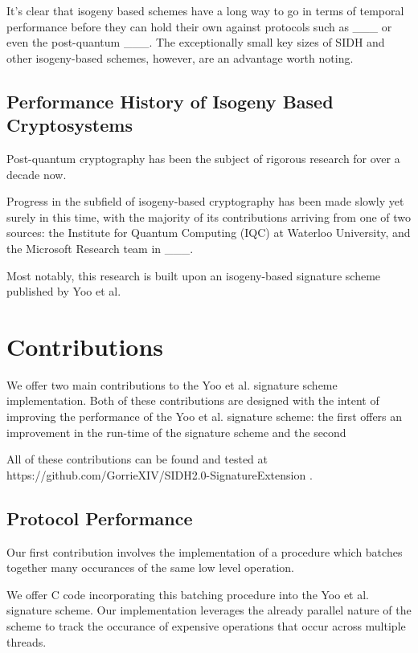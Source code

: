 It's clear that isogeny based schemes have a long way to go in terms of temporal performance before they can hold their own against protocols such as \_\_\_ or even the post-quantum \_\_\_. The exceptionally small key sizes of SIDH and other isogeny-based schemes, however, are an advantage worth noting. 

\subsection{Performance History of Isogeny Based Cryptosystems}

Post-quantum cryptography has been the subject of rigorous research for over a decade now. 

Progress in the subfield of isogeny-based cryptography has been made slowly yet surely in this time, with the majority of its contributions arriving from one of two sources: the Institute for Quantum Computing (IQC) at Waterloo University, and the Microsoft Research team in \_\_\_. 

Most notably, this research is built upon an isogeny-based signature scheme published by Yoo et al. 

\section{Contributions}

We offer two main contributions to the Yoo et al. signature scheme implementation. Both of these contributions are designed with the intent of improving the performance of the Yoo et al. signature scheme: the first offers an improvement in the run-time of the signature scheme and the second 

All of these contributions can be found and tested at https://github.com/GorrieXIV/SIDH2.0-SignatureExtension .

\subsection{Protocol Performance}

Our first contribution involves the implementation of a procedure which batches together many occurances of the same low level operation.

We offer C code incorporating this batching procedure into the Yoo et al. signature scheme. Our implementation leverages the already parallel nature of the scheme to track the occurance of expensive operations that occur across multiple threads.

